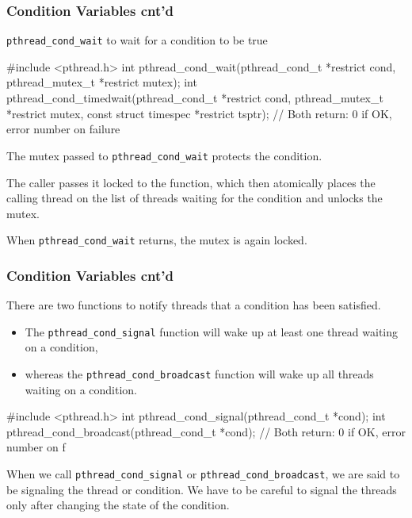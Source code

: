 \documentclass[newPxFont,sthlmFooter,nooffset]{beamer}
\begin{document}
\begin{frame}[t, fragile]
  \frametitle{Condition Variables cnt'd}
\texttt{pthread\_cond\_wait} to wait for a condition to be true

\begin{codedef}
#include <pthread.h>
int pthread_cond_wait(pthread_cond_t *restrict cond,
                      pthread_mutex_t *restrict mutex);
int pthread_cond_timedwait(pthread_cond_t *restrict cond, 
                      pthread_mutex_t *restrict mutex,
                      const struct timespec *restrict tsptr); 
// Both return: 0 if OK, error number on failure
\end{codedef}

The mutex passed to \texttt{pthread\_cond\_wait} protects the condition. 

The caller passes it locked to the function, which then atomically places the calling thread on the list of threads waiting for the condition and unlocks the mutex. 

 When \texttt{pthread\_cond\_wait} returns, the mutex is again locked.
\end{frame}

\begin{frame}[t, fragile]
  \frametitle{Condition Variables cnt'd}
There are two functions to notify threads that a condition has been satisfied.
\begin{itemize}
\item The \texttt{pthread\_cond\_signal} function will wake up at least one
  thread waiting on a condition,
\item whereas the \texttt{pthread\_cond\_broadcast} function will wake
  up all threads waiting on a condition.
\end{itemize}

\begin{codedef}
#include <pthread.h>
int pthread_cond_signal(pthread_cond_t *cond); 
int pthread_cond_broadcast(pthread_cond_t *cond);
// Both return: 0 if OK, error number on f
\end{codedef}
When we call \texttt{pthread\_cond\_signal} or \texttt{pthread\_cond\_broadcast}, we are said to be signaling the thread or condition. We have to be careful to signal the threads only after changing the state of the condition.
\end{frame}
\end{document}
